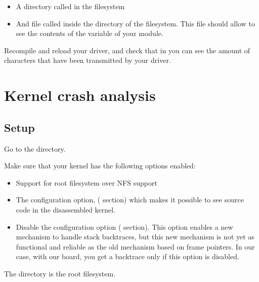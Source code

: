 \begin{itemize}

\item A directory called  in the  filesystem

\item And file called  inside the 
  directory of the  filesystem. This file should allow to see
  the contents of the  variable of your module.

\end{itemize}

Recompile and reload your driver, and check that in
 you can see the amount of characters
that have been transmitted by your driver.

\section{Kernel crash analysis}

\subsection{Setup}

Go to the  directory.

Make sure that your kernel has the following options enabled:

\begin{itemize}

\item Support for root filesystem over NFS support

\item The  configuration option,
  ( section) which makes it possible to see source
  code in the disassembled kernel.

\item Disable the  configuration option
  ( section). This option enables a new mechanism to
  handle stack backtraces, but this new mechanism is not yet as
  functional and reliable as the old mechanism based on frame
  pointers. In our case, with our board, you get a backtrace only if
  this option is disabled.

\end{itemize}

The  directory is the root filesystem.

